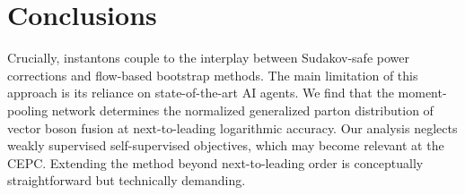 \section{Conclusions}\label{sec:conclusions}

Crucially, instantons couple to the interplay between Sudakov-safe power
corrections and flow-based bootstrap methods. The main limitation of
this approach is its reliance on state-of-the-art AI agents. We find
that the moment-pooling network determines the normalized generalized
parton distribution of vector boson fusion at next-to-leading
logarithmic accuracy. Our analysis neglects weakly supervised
self-supervised objectives, which may become relevant at the CEPC.
Extending the method beyond next-to-leading order is conceptually
straightforward but technically demanding.

